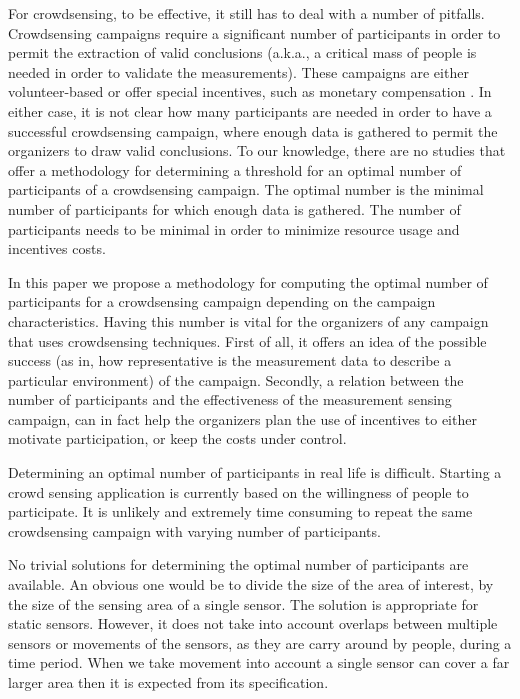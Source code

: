 For crowdsensing, to be effective, it still has to deal with a number of pitfalls. Crowdsensing campaigns require a significant number of participants in order to permit the extraction of valid conclusions (a.k.a., a critical mass of people is needed in order to validate the measurements). These campaigns are either volunteer-based or offer special incentives, such as monetary compensation \cite{ra2012medusa}. In either case, it is not clear how many participants are needed in order to have a successful crowdsensing campaign, where enough data is gathered to permit the organizers to draw valid conclusions. To our knowledge, there are no studies that offer a methodology for determining a threshold for an optimal number of participants of a crowdsensing campaign. The optimal number is the minimal number of participants for which enough data is gathered. The number of participants needs to be minimal in order to minimize resource usage and incentives costs.

In this paper we propose a methodology for computing the optimal number of participants for a crowdsensing campaign depending on the campaign characteristics. Having this number is vital for the organizers of any campaign that uses crowdsensing techniques. First of all, it offers an idea of the possible success (as in, how representative is the measurement data to describe a particular environment) of the campaign. Secondly, a relation between the number of participants and the effectiveness of the measurement sensing campaign, can in fact help the organizers plan the use of incentives to either motivate participation, or keep the costs under control.

Determining an optimal number of participants in real life is difficult. Starting a crowd sensing application is currently based on the willingness of people to participate. It is unlikely and extremely time consuming to repeat the same crowdsensing campaign with varying number of participants.

No trivial solutions for determining the optimal number of participants are available. An obvious one would be to divide the size of the area of interest, by the size of the sensing area of a single sensor. The solution is appropriate for static sensors. However, it does not take into account overlaps between multiple sensors or movements of the sensors, as they are carry around by people, during a time period. When we take movement into account a single sensor can cover a far larger area then it is expected from its specification.

